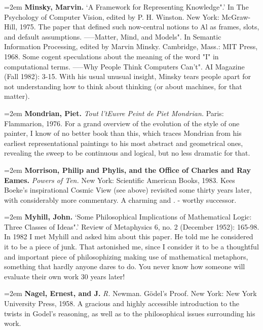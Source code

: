 \par\noindent\hangindent=2em {\bf Minsky, Marvin.} `A Framework for Representing Knowledge".' In The Psychology of Computer Vision, edited by P. H. Winston. New York: McGraw-Hill, 1975. The paper that defined such now-central notions to Al as frames, slots, and default assumptions. -----Matter, Mind, and Models". In Semantic Information Processing, edited by Marvin Minsky. Cambridge, Mass.: MIT Press, 1968. Some cogent speculations about the meaning of the word "I" in computational terms. -----Why People Think Computers Can't". AI Magazine (Fall 1982): 3-15. With his usual unusual insight, Minsky tears people apart for not understanding how to think about thinking (or about machines, for that matter).

\par\noindent\hangindent=2em {\bf Mondrian, Piet.} {\it Tout l'tEuvre Peint de Piet Mondrian.} Paris: Flammarion, 1976. For a grand overview of the evolution of the style of one painter, I know of no better book than this, which traces Mondrian from his earliest representational paintings to his most abstract and geometrical ones, revealing the sweep to be continuous and logical, but no less dramatic for that.

\par\noindent\hangindent=2em {\bf Morrison, Philip and Phylis, and the Office of Charles and Ray Eames.} {\it Powers of Ten.} New York: Scientific American Books, 1983. Kees Boeke's inspirational Cosmic View (see above) revisited some thirty years later, with considerably more commentary. A charming and . - worthy successor.

\par\noindent\hangindent=2em {\bf Myhill, John.} `Some Philosophical Implications of Mathematical Logic: Three Classes of Ideas".' Review of Metaphysics 6, no. 2 (December 1952): 165-98. In 1982 I met Myhill and asked him about this paper. He told me he considered it to be a piece of junk. That astonished me, since I consider it to be a thoughtful and important piece of philosophizing making use of mathematical metaphors, something that hardly anyone dares to do. You never know how someone will evaluate their own work 30 years later!

\par\noindent\hangindent=2em {\bf Nagel, Ernest, and J.} {\it R.} Newman. Gödel’s Proof. New York: New York University Press, 1958. A gracious and highly accessible introduction to the twists in Godel's reasoning, as well as to the philosophical issues surrounding his work.

